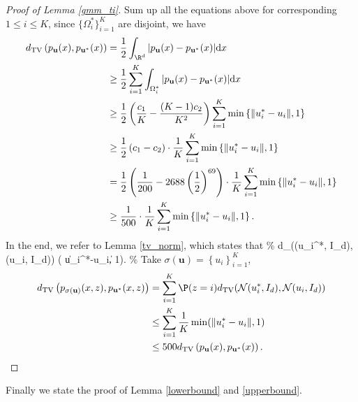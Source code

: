 \begin{proof}[Proof of Lemma \ref{gmm_ti}]
Sum up all the equations above for corresponding $1 \leq i \leq K$, since $\{\Omega_{i}^{*}\}_{i=1}^{K}$ are disjoint, we have
\begin{align}
d_{\mathrm{TV}}\left(p_{\mathbf{u}}(x), p_{\mathbf{u}^* }(x)\right) &= \frac{1}{2} \int_{\R^{d}} |p_{\mathbf{u}}(x)- p_{\mathbf{u}^* }(x)| \mathrm{d}x \notag\\
&\geq \frac{1}{2}\sum_{i=1}^{K} \int_{\Omega_{i}^{*}} |p_{\mathbf{u}}(x)- p_{\mathbf{u}^* }(x)| \mathrm{d}x \notag \\
&\geq \frac{1}{2}\left( \frac{c_1}{K}- \frac{(K-1)c_{2}}{K^{2}} \right) \sum_{i=1}^{K} \min \left\{ \|u_{i}^{*}-u_{i}\|, 1 \right\} \notag \\
&\geq \frac{1}{2} \left( c_{1}- c_{2} \right) \cdot \frac{1}{K} \sum_{i=1}^{K} \min \left\{ \|u_{i}^{*}-u_{i}\|, 1 \right\} \notag \\
&=\frac{1}{2}\left(\frac{1}{200} - 2688 \left(\frac{1}{2}\right)^{69}\right) \cdot \frac{1}{K} \sum_{i=1}^{K} \min \left\{ \|u_{i}^{*}-u_{i}\|, 1 \right\} \notag \\
&\geq \frac{1}{500} \cdot \frac{1}{K} \sum_{i=1}^{K} \min \left\{ \|u_{i}^{*}-u_{i}\|, 1 \right\}.
\end{align}
In the end, we refer to Lemma \ref{tv_norm}, which states that 
\%
d_{}((u_{i}^{*}, I_{d}), (u_{i}, I_{d})) \leq \min ( \|u_{i}^{*}-u_{i}\|, 1).
\%
Take $\sigma(\boldsymbol{u})= \left\{u_i\right\}_{i=1}^K$,
\begin{align}
d_{\mathrm{TV}}\left(p_{\sigma(\mathbf{u})}(x, z), p_{\mathbf{u}^* }(x, z)\right) &= \sum_{i=1}^{K} \P (z=i) d_{\mathrm{TV}} (\mathcal{N}(u_{i}^{*},I_{d}),\mathcal{N}(u_{i},I_{d})) \notag \\
&\leq  \sum_{i=1}^{K} \frac{1}{K} \min ( \|u_{i}^{*}-u_{i}\|, 1) \notag \\
&\leq 500 d_{\mathrm{TV}}\left(p_{\mathbf{u}}(x), p_{\mathbf{u}^* }(x)\right).
\end{align}
\end{proof}
Finally we state the proof of Lemma \ref{lowerbound} and \ref{upperbound}. 

